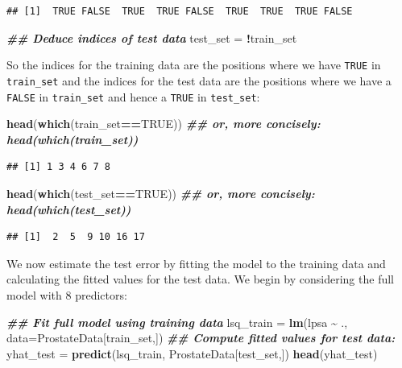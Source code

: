 \documentclass[
]{article}
\newenvironment{Shaded}{\begin{snugshade}}{\end{snugshade}}
\newcommand{\AttributeTok}[1]{\textcolor[rgb]{0.13,0.29,0.53}{#1}}
\newcommand{\ConstantTok}[1]{\textcolor[rgb]{0.56,0.35,0.01}{#1}}
\newcommand{\DocumentationTok}[1]{\textcolor[rgb]{0.56,0.35,0.01}{\textbf{\textit{#1}}}}
\newcommand{\FunctionTok}[1]{\textcolor[rgb]{0.13,0.29,0.53}{\textbf{#1}}}
\newcommand{\NormalTok}[1]{#1}
\newcommand{\OtherTok}[1]{\textcolor[rgb]{0.56,0.35,0.01}{#1}}
\newcommand{\SpecialCharTok}[1]{\textcolor[rgb]{0.81,0.36,0.00}{\textbf{#1}}}
\begin{document}
\begin{verbatim}
## [1]  TRUE FALSE  TRUE  TRUE FALSE  TRUE  TRUE  TRUE FALSE
\end{verbatim}

\begin{Shaded}
\begin{Highlighting}[]
\DocumentationTok{\#\# Deduce indices of test data}
\NormalTok{test\_set }\OtherTok{=} \SpecialCharTok{!}\NormalTok{train\_set}
\end{Highlighting}
\end{Shaded}

So the indices for the training data are the positions where we have
\texttt{TRUE} in \texttt{train\_set} and the indices for the test data
are the positions where we have a \texttt{FALSE} in \texttt{train\_set}
and hence a \texttt{TRUE} in \texttt{test\_set}:

\begin{Shaded}
\begin{Highlighting}[]
\FunctionTok{head}\NormalTok{(}\FunctionTok{which}\NormalTok{(train\_set}\SpecialCharTok{==}\ConstantTok{TRUE}\NormalTok{)) }\DocumentationTok{\#\# or, more concisely: head(which(train\_set))}
\end{Highlighting}
\end{Shaded}

\begin{verbatim}
## [1] 1 3 4 6 7 8
\end{verbatim}

\begin{Shaded}
\begin{Highlighting}[]
\FunctionTok{head}\NormalTok{(}\FunctionTok{which}\NormalTok{(test\_set}\SpecialCharTok{==}\ConstantTok{TRUE}\NormalTok{))  }\DocumentationTok{\#\# or, more concisely: head(which(test\_set))}
\end{Highlighting}
\end{Shaded}

\begin{verbatim}
## [1]  2  5  9 10 16 17
\end{verbatim}

We now estimate the test error by fitting the model to the training data
and calculating the fitted values for the test data. We begin by
considering the full model with 8 predictors:

\begin{Shaded}
\begin{Highlighting}[]
\DocumentationTok{\#\# Fit full model using training data}
\NormalTok{lsq\_train }\OtherTok{=} \FunctionTok{lm}\NormalTok{(lpsa }\SpecialCharTok{\textasciitilde{}}\NormalTok{ ., }\AttributeTok{data=}\NormalTok{ProstateData[train\_set,])}
\DocumentationTok{\#\# Compute fitted values for test data:}
\NormalTok{yhat\_test }\OtherTok{=} \FunctionTok{predict}\NormalTok{(lsq\_train, ProstateData[test\_set,])}
\FunctionTok{head}\NormalTok{(yhat\_test)}
\end{Highlighting}
\end{Shaded}
\end{document}
